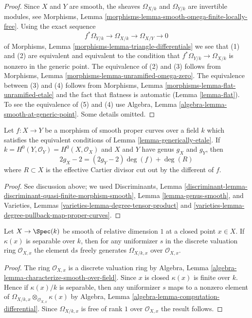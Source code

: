 \begin{proof}
Since $X$ and $Y$ are smooth, the sheaves $\Omega_{X/k}$ and
$\Omega_{Y/k}$ are invertible modules, see
Morphisms, Lemma \ref{morphisms-lemma-smooth-omega-finite-locally-free}.
Using the exact sequence
$$
f^*\Omega_{Y/k} \longrightarrow \Omega_{X/k}
\longrightarrow \Omega_{X/Y} \longrightarrow 0
$$
of Morphisms, Lemma \ref{morphisms-lemma-triangle-differentials}
we see that (1) and (2) are equivalent and equivalent to the
condition that $f^*\Omega_{Y/k} \to \Omega_{X/k}$ is nonzero
in the generic point. The equivalence of (2) and (3) follows
from Morphisms, Lemma \ref{morphisms-lemma-unramified-omega-zero}.
The equivalence between (3) and (4) follows from
Morphisms, Lemma \ref{morphisms-lemma-flat-unramified-etale}
and the fact that flatness is automatic
(Lemma \ref{lemma-flat}).
To see the equivalence of (5) and (4)
use Algebra, Lemma \ref{algebra-lemma-smooth-at-generic-point}.
Some details omitted.
\end{proof}

\begin{lemma}
\label{lemma-rh}
Let $f : X \to Y$ be a morphism of smooth proper curves
over a field $k$ which satisfies the equivalent conditions of
Lemma \ref{lemma-generically-etale}. If
$k = H^0(Y, \mathcal{O}_Y) = H^0(X, \mathcal{O}_X)$
and $X$ and $Y$ have genus $g_X$ and $g_Y$, then
$$
2g_X - 2 = (2g_Y - 2) \deg(f) + \deg(R)
$$
where $R \subset X$ is the effective Cartier divisor cut out by
the different of $f$.
\end{lemma}

\begin{proof}
See discussion above; we used
Discriminants, Lemma
\ref{discriminant-lemma-discriminant-quasi-finite-morphism-smooth},
Lemma \ref{lemma-genus-smooth}, and
Varieties, Lemmas \ref{varieties-lemma-degree-tensor-product} and
\ref{varieties-lemma-degree-pullback-map-proper-curves}.
\end{proof}

\begin{lemma}
\label{lemma-uniformizer-works}
Let $X \to \Spec(k)$ be smooth of relative dimension $1$ at a closed
point $x \in X$. If $\kappa(x)$ is separable over $k$, then for
any uniformizer $s$ in the discrete valuation ring $\mathcal{O}_{X, x}$
the element $\text{d}s$ freely generates $\Omega_{X/k, x}$
over $\mathcal{O}_{X, x}$.
\end{lemma}

\begin{proof}
The ring $\mathcal{O}_{X, x}$ is a discrete valuation ring by
Algebra, Lemma \ref{algebra-lemma-characterize-smooth-over-field}.
Since $x$ is closed $\kappa(x)$ is finite over $k$. Hence if
$\kappa(x)/k$ is separable, then any uniformizer $s$
maps to a nonzero element of
$\Omega_{X/k, x} \otimes_{\mathcal{O}_{X, x}} \kappa(x)$ by
Algebra, Lemma \ref{algebra-lemma-computation-differential}.
Since $\Omega_{X/k, x}$ is free of rank $1$ over $\mathcal{O}_{X, x}$
the result follows.
\end{proof}

